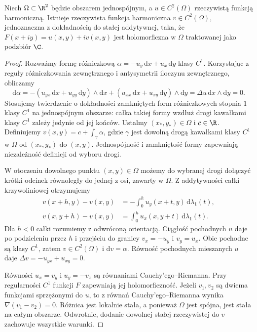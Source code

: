 \begin{stwierdzenie}
\label{prop:pde3-conjugate}
Niech $\Omega\subset\R^2$ będzie obszarem jednospójnym,
a $u\in C^2(\Omega)$ rzeczywistą funkcją harmoniczną.
Istnieje rzeczywista funkcja harmoniczna $v\in C^2(\Omega)$,
jednoznaczna z dokładnością do stałej addytywnej, taka,
że $F(x+iy)=u(x,y)+iv(x,y)$ jest holomorficzna w $\Omega$
traktowanej jako podzbiór $\C$.
\end{stwierdzenie}
\begin{proof}
Rozważmy formę różniczkową
$\alpha=-u_y\,\mathrm dx+u_x\,\mathrm dy$ klasy $C^1$.
Korzystając z reguły różniczkowania zewnętrznego
i antysymetrii iloczynu zewnętrznego, obliczamy
\[
 \mathrm d\alpha
 =-(u_{yx}\,\mathrm dx+u_{yy}\,\mathrm dy)
       \wedge\mathrm dx
 +(u_{xx}\,\mathrm dx+u_{xy}\,\mathrm dy)
       \wedge\mathrm dy
 =\Delta u\,\mathrm dx\wedge\mathrm dy=0.
\]
Stosujemy twierdzenie o dokładności zamkniętych form
różniczkowych stopnia $1$ klasy $C^1$ na jednospójnym
obszarze: całka takiej formy wzdłuż drogi kawałkami
klasy $C^1$ zależy jedynie od jej końców.
Ustalmy $(x_*,y_*)\in\Omega$ i $c\in\R$.
Definiujemy $v(x,y)=c+\int_\gamma\alpha$, gdzie
$\gamma$ jest dowolną drogą kawałkami klasy $C^1$
w $\Omega$ od $(x_*,y_*)$ do $(x,y)$.
Jednospójność i zamkniętość formy zapewniają
niezależność definicji od wyboru drogi.

W otoczeniu dowolnego punktu $(x,y)\in\Omega$
możemy do wybranej drogi dołączyć krótki odcinek
równoległy do jednej z osi, zawarty w $\Omega$.
Z addytywności całki krzywoliniowej otrzymujemy
\[
 \begin{aligned}
 v(x+h,y)-v(x,y)&=-\int_0^h u_y(x+t,y)\,
                       \mathrm d\lambda_1(t),\\
 v(x,y+h)-v(x,y)&=\int_0^h u_x(x,y+t)\,
                       \mathrm d\lambda_1(t).
 \end{aligned}
\]
Dla $h<0$ całki rozumiemy z odwróconą orientacją.
Ciągłość pochodnych $u$ daje po podzieleniu przez $h$
i przejściu do granicy
$v_x=-u_y$ i $v_y=u_x$. Obie pochodne są klasy $C^1$,
zatem $v\in C^2(\Omega)$ i $\mathrm dv=\alpha$.
Równość pochodnych mieszanych $u$ daje
$\Delta v=-u_{yx}+u_{xy}=0$.

Równości $u_x=v_y$ i $u_y=-v_x$ są równaniami
Cauchy'ego--Riemanna. Przy regularności $C^1$
funkcji $F$ zapewniają jej holomorficzność.
Jeżeli $v_1,v_2$ są dwiema funkcjami sprzężonymi
do $u$, to z równań Cauchy'ego--Riemanna wynika
$\nabla(v_1-v_2)=0$. Różnica jest lokalnie stała,
a ponieważ $\Omega$ jest spójna, jest stała na
całym obszarze. Odwrotnie, dodanie dowolnej stałej
rzeczywistej do $v$ zachowuje wszystkie warunki.
\end{proof}

